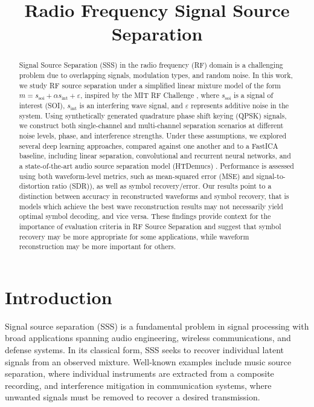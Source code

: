 \documentclass[conference]{IEEEtran}
\begin{document}
\title{Radio Frequency Signal Source Separation\\}
\author{
\and
{}
\and
{}
}

\maketitle
\thispagestyle{plain}
\pagestyle{plain}
\noindent
\begin{abstract}
Signal Source Separation (SSS) in the radio frequency (RF) domain is a challenging problem due to overlapping signals, modulation types, and random noise. In this work, we study RF source separation under a simplified linear mixture model of the form $m = s_\text{soi} + \alpha s_\text{int} + \varepsilon$, inspired by the MIT RF Challenge \cite{mit_rfchallenge}, where $s_\text{soi}$ is a signal of interest (SOI), $s_\text{int}$ is an interfering wave signal, and $\varepsilon$ represents additive noise in the system. Using synthetically generated quadrature phase shift keying (QPSK) signals, we construct both single-channel and multi-channel separation scenarios at different noise levels, phase, and interference strengths. Under these assumptions, we explored several deep learning approaches, compared against one another and to a FastICA baseline, including linear separation, convolutional and recurrent neural networks, and a state-of-the-art audio source separation model (HTDemucs) \cite{defossez2019demucs}. Performance is assessed using both waveform-level metrics, such as mean-squared error (MSE) and signal-to-distortion ratio (SDR)), as well as symbol recovery/error. Our results point to a distinction between accuracy in reconstructed waveforms and symbol recovery, that is models which achieve the best wave reconstruction results may not necessarily yield optimal symbol decoding, and vice versa. These findings provide context for the importance of evaluation criteria in RF Source Separation and suggest that symbol recovery may be more appropriate for some applications, while waveform reconstruction may be more important for others.
\end{abstract}

\section{Introduction}
Signal source separation (SSS) is a fundamental problem in signal processing with broad applications spanning audio engineering, wireless communications, and defense systems. In its classical form, SSS seeks to recover individual latent signals from an observed mixture. Well-known examples include music source separation, where individual instruments are extracted from a composite recording, and interference mitigation in communication systems, where unwanted signals must be removed to recover a desired transmission.\\
\end{document}
